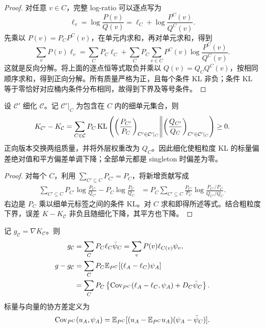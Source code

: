 \begin{proof}
对任意 $v\in C$，完整 log-ratio 可以逐点写为
\begin{equation*}
 \ell_v=\log\frac{P(v)}{Q(v)}
     =\ell_C+\log\frac{P^C(v)}{Q^C(v)}.
\end{equation*}
先乘以 $P(v)=P_CP^C(v)$，在单元内求和，再对单元求和，得到
\begin{equation*}
 \sum_vP(v)\ell_v
 =\sum_CP_C\ell_C
  +\sum_CP_C\sum_{v\in C}P^C(v)
                        \log\frac{P^C(v)}{Q^C(v)}.
\end{equation*}
这就是反向分解。将上面的逐点恒等式取负并乘以 $Q(v)=Q_CQ^C(v)$，按相同顺序求和，得到正向分解。所有质量严格为正，且每个条件 KL 非负；条件 KL 等于零恰好对应桶内条件分布相同，故得到下界及等号条件。
\end{proof}

\begin{proposition}[分区细化的标量单调性]
\label{inf:prop:kl-partition-refinement}
设 $\mathcal C'$ 细化 $\mathcal C$。记 $\mathcal C'|_C$ 为包含在 $C$ 内的细单元集合，则
\begin{equation*}
 K_{\mathcal C'}-K_{\mathcal C}
 =\sum_{C\in\mathcal C}P_C
   \operatorname{KL}\left(
       \left(\frac{P_{C'}}{P_C}\right)_{C'\in\mathcal C'|_C}
       \middle\Vert
       \left(\frac{Q_{C'}}{Q_C}\right)_{C'\in\mathcal C'|_C}
      \right)\geq0.
\end{equation*}
正向版本交换两组质量，并将外层权重改为 $Q_C$。因此细化使粗粒度 KL 的标量偏差绝对值和平方偏差单调下降；全部单元都是 singleton 时偏差为零。
\end{proposition}

\begin{proof}
对每个 $C$，利用 $\sum_{C'\subseteq C}P_{C'}=P_C$，将新增贡献写成
\begin{align*}
 \sum_{C'\subseteq C}P_{C'}\log\frac{P_{C'}}{Q_{C'}}
    -P_C\log\frac{P_C}{Q_C}
 &=P_C\sum_{C'\subseteq C}\frac{P_{C'}}{P_C}
       \log\frac{P_{C'}/P_C}{Q_{C'}/Q_C}.
\end{align*}
右边是 $P_C$ 乘以细单元标签之间的条件 KL。对 $C$ 求和即得所述等式。结合粗粒度下界，误差 $K-K_{\mathcal C}$ 非负且随细化下降，其平方也下降。
\end{proof}

\begin{theorem}
\label{inf:thm:kl-partition-gradient}
记 $g_{\mathcal C}=\nabla K_{\mathcal C}$。则
\begin{align}
 g_{\mathcal C}
 &=\sum_CP_C\ell_C\bar \psi_C
  =\sum_vP(v)\ell_{C(v)}\psi_v,
 \label{inf:eq:kl-partition-gradient}\\
 g-g_{\mathcal C}
 &=\sum_CP_C\mathbb E_{P^C}[(\ell_A-\ell_C)\psi_A]
 \label{inf:eq:kl-partition-gradient-residual}\\
 &=\sum_CP_C\left\{
       \operatorname{Cov}_{P^C}(\ell_A-\ell_C,\psi_A)
       +D_C\bar \psi_C\right\}.
 \label{inf:eq:kl-partition-gradient-covariance}
\end{align}
标量与向量的协方差定义为
\begin{equation*}
 \operatorname{Cov}_{P^C}(u_A,\psi_A)
 =\mathbb E_{P^C}[(u_A-\mathbb E_{P^C}u_A)(\psi_A-\bar \psi_C)].
\end{equation*}
\end{theorem}

